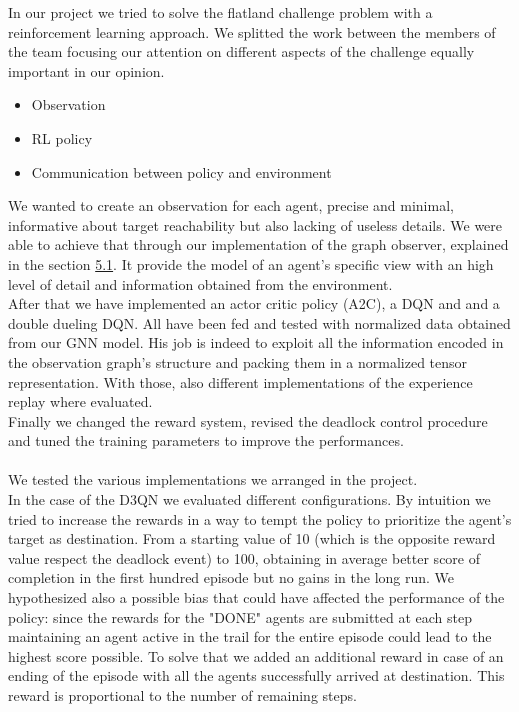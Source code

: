 In our project we tried to solve the flatland challenge problem with a reinforcement learning approach. We splitted the work between the members of the team focusing our attention on different aspects of the challenge equally important in our opinion.
\begin{itemize}
	\item Observation
	\item RL policy 
	\item Communication between policy and environment
\end{itemize}
We wanted to create an observation for each agent, precise and minimal, informative  about target reachability but also lacking of useless details. We were able to achieve that through our implementation of the graph observer, explained in the section \hyperref[sec:dagObserv]{5.1}. It provide the model of an agent's specific view with an high level of detail and information obtained from the environment. \\
After that we have implemented an actor critic policy (A2C), a DQN and and a double dueling DQN. All have been fed and tested with normalized data obtained from our GNN model. His job is indeed to exploit all the information encoded in the observation graph's structure and packing them in a normalized tensor representation. With those, also different implementations of the experience replay where evaluated.\\ 
Finally we changed the reward system, revised the deadlock control procedure and tuned the training parameters to improve the performances.\\
\\
\noindent
We tested the various implementations we arranged in the project.\\
In the case of the D3QN we evaluated different configurations. By intuition we tried to increase the rewards in a way to tempt the policy to prioritize the agent's target as destination. From a starting value of 10 (which is the opposite reward value respect the deadlock event) to 100, obtaining in average better score of completion in the first hundred episode but no gains in the long run.
We hypothesized also a possible bias that could have affected the performance of the policy: since the rewards for the "DONE" agents are submitted at each step maintaining an agent active in the trail for the entire episode could lead to the highest score possible. To solve that we added an additional reward in case of an ending of the episode with all the agents successfully arrived at destination. This reward is proportional to the number of remaining steps.\\
